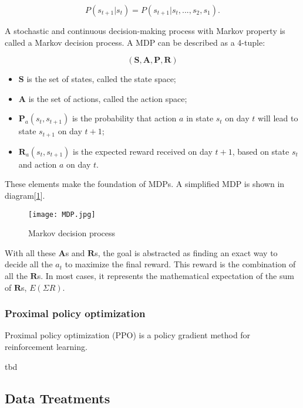 \documentclass{mcmthesis}
\begin{document}
\begin{equation}
  P(s_{t+1}\vert s_t) = P(s_{t+1}\vert s_t,...,s_2,s_1).
\end{equation}

A stochastic and continuous decision-making process with Markov property
is called a Markov decision process.
A MDP can be described as a 4-tuple:

\begin{equation}
(\pmb{S},\pmb{A},\pmb{P},\pmb{R})
\end{equation}

\begin{itemize}
  \item $\pmb{S}$ is the set of states, called the state space;
  \item $\pmb{A}$ is the set of actions, called the action space;
  \item $\pmb{P}_a(s_t, s_{t+1})$ is the probability that action $a$ in state $s_t$ on day $t$ will lead to state $s_{t+1}$ on day $t+1$;
  \item $\pmb{R}_a(s_t, s_{t+1})$ is the expected reward received on day $t+1$, based on state $s_t$ and action $a$ on day $t$.
\end{itemize}

These elements make the foundation of MDPs.
A simplified MDP is shown in diagram[\ref{MDP}].

\begin{figure}[h]
  \small
  \centering
  \texttt{[image: MDP.jpg]}
  \caption{Markov decision process} \label{MDP}
\end{figure}

With all these $\pmb{A}$s and $\pmb{R}$s,
the goal is abstracted as finding an exact way to decide all the $a_t$
to maximize the final reward.
This reward is the combination of all the $\pmb{R}$s.
In most cases, it represents the mathematical expectation of the sum of $\pmb{R}$s,
$E(\Sigma R)$.

\subsubsection{Proximal policy optimization}

Proximal policy optimization (PPO) is a policy gradient method for reinforcement learning.

tbd

\subsection{Data Treatments}
\end{document}

